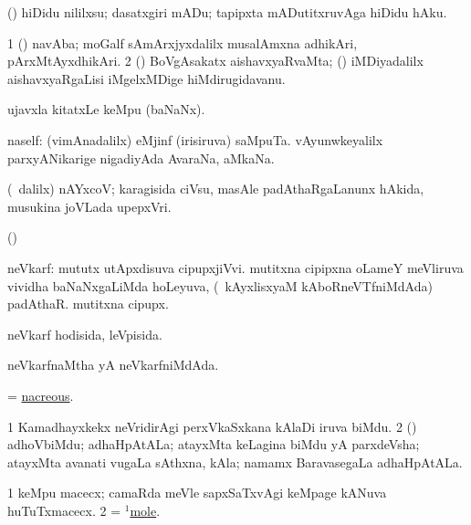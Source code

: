 \bentry
{}
\gl{\sakirx}
\bmng
 (\ashi) hiDidu nililxsu; dasatxgiri mADu; tapipxta mADutitxruvAga hiDidu hAku. 
\emng
\eentry

\bentry
{}
\gl{\nA}
\bmng
\bnum
\num{1} (\ca) navAba; moGalf sAmArxjyxdalilx musalAmxna adhikAri, pArxMtAyxdhikAri. 
\num{2} (\pArxparx) BoVgAsakatx aishavxyaRvaMta; (\kanmu) iMDiyadalilx aishavxyaRgaLisi iMgelxMDige hiMdirugidavanu. 
\enum
\emng
\eentry

\bentry
{}
\gl{\nA}
\bmng
ujavxla kitatxLe keMpu (baNaNx). 
\emng
\eentry

\bentry
{}
\gl{\nA}
\bmng
naself: 
\banum
{}(vimAnadalilx) eMjinf (irisiruva) saMpuTa. 
vAyunwkeyalilx parxyANikarige nigadiyAda AvaraNa, aMkaNa. 
\eanum
\emng
\eentry

\bentry
{}
\gl{\nA}
\bmng
 (\sA\ \bava dalilx) nAYxcoV; karagisida ciVsu, masAle padAthaRgaLanunx hAkida, musukina joVLada upepxVri. 
\emng
\eentry

\bentry
{}
\gl{\saMkiSx}
\bmng
(\birx)  
\emng
\eentry

\bentry
{}
\gl{\nA}
\bmng
neVkarf: 
\banum
{} mututx utApxdisuva cipupxjiVvi. 
 mutitxna cipipxna oLameY meVliruva vividha baNaNxgaLiMda hoLeyuva, (\kanmu\ kAyxlisxyaM kAboRneVTfniMdAda) padAthaR. 
 mutitxna cipupx. 
\eanum
\emng
\eentry

\bentry
{}
\gl{\gu}
\bmng
neVkarf hodisida, leVpisida. 
\emng
\eentry

\bentry
{}
\gl{\gu}
\bmng
neVkarfnaMtha yA neVkarfniMdAda. 
\emng
\eentry

\bentry
{}
\gl{\gu}
\bmng
= \hyperlink{nacreous}{nacreous}.
\emng
\eentry

\bentry
{}
\gl{\nA}
\bmng
\bnum
\num{1} Kamadhayxkekx neVridirAgi perxVkaSxkana kAlaDi iruva biMdu. 
\num{2} (\rUpa) adhoVbiMdu; adhaHpAtALa; atayxMta keLagina biMdu yA parxdeVsha; atayxMta avanati \mo vugaLa sAthxna, kAla;  namamx BaravasegaLa adhaHpAtALa. 
\enum
\emng
\eentry

\bentry
{}
\gl{\nA}
\bmng
\bnum
\num{1} keMpu macecx; camaRda meVle sapxSaTxvAgi keMpage kANuva huTuTxmacecx. 
\num{2} = \hyperref{kandict_m.pdf}{M}{mole(1)}{$^1$mole}. 
\enum
\emng
\eentry

